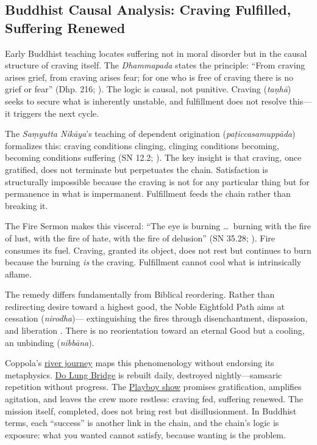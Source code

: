 \subsection*{Buddhist Causal Analysis: Craving Fulfilled, Suffering Renewed}
\label{ssec:iii-buddhist-causal-analysis}

Early Buddhist teaching locates suffering not in moral disorder but in the causal structure of
craving itself. The \emph{Dhammapada} states the principle: ``From craving arises grief, from
craving arises fear; for one who is free of craving there is no grief or fear'' (Dhp. 216;
\parencite{BuddharakkhitaDhp1993}). The logic is causal, not punitive. Craving (\emph{taṇhā})
seeks to secure what is inherently unstable, and fulfillment does not resolve this---it
triggers the next cycle.

The \emph{Saṃyutta Nikāya}'s teaching of dependent origination
(\emph{paṭiccasamuppāda}) formalizes this: craving conditions clinging, clinging conditions
becoming, becoming conditions suffering (SN 12.2; \parencite[p.~536]{BodhiSN2000}). The key
insight is that craving, once gratified, does not terminate
but perpetuates the chain. Satisfaction is structurally impossible because the craving is not
for any particular thing but for permanence in what is impermanent. Fulfillment feeds the
chain rather than breaking it.

The Fire Sermon makes this visceral: ``The eye is burning \ldots\ burning with the fire of
lust, with the fire of hate, with the fire of delusion'' (SN 35.28;
\parencite[p.~1143]{BodhiSN2000}). Fire consumes its fuel. Craving, granted its object, does
not rest but continues to burn because the burning \emph{is} the craving. Fulfillment cannot
cool what is intrinsically aflame.

The remedy differs fundamentally from Biblical reordering. Rather than redirecting desire
toward a highest good, the Noble Eightfold Path aims at cessation (\emph{nirodha})---
extinguishing the fires through disenchantment, dispassion, and liberation
\parencite[pp.~45--50]{Rahula1959}. There is no reorientation toward an eternal Good but a
cooling, an unbinding (\emph{nibbāna}).

Coppola's \hyperref[scene:upriver-journey]{river journey} maps this phenomenology without
endorsing its metaphysics. \hyperref[scene:do-lung-bridge]{Do Lung Bridge} is rebuilt daily,
destroyed nightly---samsaric repetition without progress. The
\hyperref[scene:playboy-show]{Playboy show} promises gratification, amplifies agitation, and
leaves the crew more restless: craving fed, suffering renewed. The mission itself, completed,
does not bring rest but disillusionment. In Buddhist terms, each ``success'' is another link
in the chain, and the chain's logic is
exposure: what you wanted cannot satisfy, because wanting is the problem.
